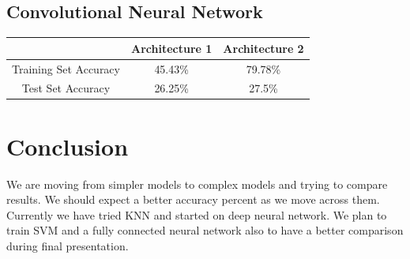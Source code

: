 \documentclass{article} %
\begin{document}
\subsection{Convolutional Neural Network}

\centering
\begin{tabular}{|c|c|c|}
\hline 
&
Architecture 1 &
Architecture 2 \\
\hline 
Training Set Accuracy &
45.43\% &
79.78\% \\
\hline 
Test Set Accuracy &
26.25\% &
27.5\% \\
\hline 
\end{tabular}



\section{Conclusion}

We are moving from simpler models to complex models and trying to compare results. We should expect a better accuracy percent as we move across them. Currently we have tried KNN and started on deep neural network. We plan to train SVM and a fully connected neural network also to have a better comparison during final presentation.
\end{document}
